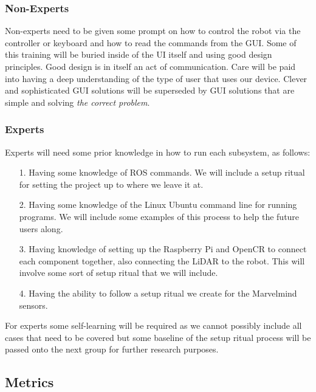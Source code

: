 \documentclass[english,12pt]{article}
\begin{document}
\subsubsection{Non-Experts}
Non-experts need to be given some prompt on how to control the robot via the controller or 
keyboard and how to read the commands from the GUI. Some of this training will be buried inside 
of the UI itself and using good design principles. Good design is in itself an act of communication.
Care will be paid into having a deep understanding of the type of user that uses our device.
Clever and sophisticated GUI solutions will be superseded by GUI solutions that are simple and solving 
\textit{the correct problem}. 
\subsubsection{Experts}
Experts will need some prior knowledge in how to run each subsystem, as follows:\\
\begin{itemize}
    \item[1.] Having some knowledge of ROS commands. We will include a setup ritual for setting the project 
    up to where we leave it at.
    \item[2.] Having some knowledge of the Linux Ubuntu command line for running programs. We will 
    include some examples of this process to help the future users along.
    \item[3.] Having knowledge of setting up the Raspberry Pi and OpenCR to connect each component together, 
    also connecting the LiDAR to the robot. This will involve some sort of setup ritual that we will include.
    \item[4. ] Having the ability to follow a setup ritual we create for the Marvelmind sensors.  
\end{itemize}
For experts some self-learning will be required as we cannot possibly include all cases that need to be covered 
but some baseline of the setup ritual process will be passed onto the next group for further research purposes.
\subsection{Metrics}
\end{document}

